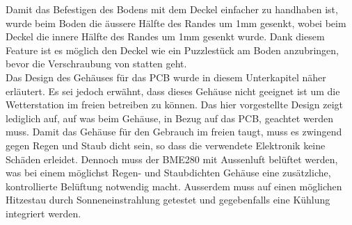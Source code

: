 {{\begin{minipage}[b][6cm][t]{0.49\textwidth}
\label{fig:D:Deckel:Rand}
\end{minipage}}

Damit das Befestigen des Bodens mit dem Deckel einfacher zu handhaben ist, wurde beim Boden die äussere Hälfte des Randes um 1mm gesenkt, wobei beim Deckel die innere Hälfte des Randes um 1mm gesenkt wurde. Dank diesem Feature ist es möglich den Deckel wie ein Puzzlestück am Boden anzubringen, bevor die Verschraubung von statten geht.\\[0.25cm]
Das Design des Gehäuses für das PCB wurde in diesem Unterkapitel näher erläutert. Es sei jedoch erwähnt, dass dieses Gehäuse nicht geeignet ist um die Wetterstation im freien betreiben zu können. Das hier vorgestellte Design zeigt lediglich auf, auf was beim Gehäuse, in Bezug auf das PCB, geachtet werden muss. Damit das Gehäuse für den Gebrauch im freien taugt, muss es zwingend gegen Regen und Staub dicht sein, so dass die verwendete Elektronik keine Schäden erleidet. Dennoch muss der BME280 mit Aussenluft belüftet werden, was bei einem möglichst Regen- und Staubdichten Gehäuse eine zusätzliche, kontrollierte Belüftung notwendig macht. Ausserdem muss auf einen möglichen Hitzestau durch Sonneneinstrahlung getestet und gegebenfalls eine Kühlung integriert werden.

}
